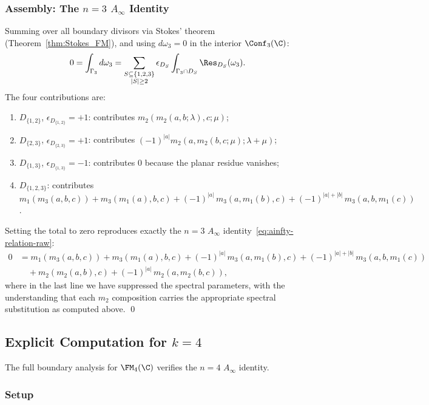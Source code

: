 \subsubsection{Assembly: The $n=3$ $A_\infty$ Identity}

\begin{proposition}[$k=3$ Stasheff identity]
\label{prop:k3_identity}
Summing over all boundary divisors via Stokes' theorem (Theorem~\ref{thm:Stokes_FM}), and using $d\omega_3 = 0$ in the interior $\Conf_3(\C)$:
\[
0 = \int_{\Gamma_3} d\omega_3 =
\sum_{\substack{S \subseteq \{1,2,3\} \\ |S| \geq 2}}
\epsilon_{D_S}\int_{\Gamma_3 \cap D_S}\Res_{D_S}(\omega_3).
\]
The four contributions are:
\begin{enumerate}[label=(\roman*)]
\item \(D_{\{1,2\}}\), \(\epsilon_{D_{\{1,2\}}}=+1\):
contributes \(m_2(m_2(a,b;\lambda),c;\mu)\);
\item \(D_{\{2,3\}}\), \(\epsilon_{D_{\{2,3\}}}=+1\):
contributes \((-1)^{|a|}m_2(a,m_2(b,c;\mu);\lambda+\mu)\);
\item \(D_{\{1,3\}}\), \(\epsilon_{D_{\{1,3\}}}=-1\):
contributes \(0\) because the planar residue vanishes;
\item $D_{\{1,2,3\}}$: contributes $m_1(m_3(a,b,c)) + m_3(m_1(a),b,c) + (-1)^{|a|}\, m_3(a,m_1(b),c) + (-1)^{|a|+|b|}\, m_3(a,b,m_1(c))$.
\end{enumerate}
Setting the total to zero reproduces exactly the $n=3$ $A_\infty$ identity~\eqref{eq:ainfty-relation-raw}:
\begin{align*}
0 &= m_1(m_3(a,b,c)) + m_3(m_1(a),b,c) + (-1)^{|a|}\, m_3(a,m_1(b),c) + (-1)^{|a|+|b|}\, m_3(a,b,m_1(c)) \\
&\quad + m_2(m_2(a,b),c) + (-1)^{|a|}\, m_2(a,m_2(b,c)),
\end{align*}
where in the last line we have suppressed the spectral parameters, with the understanding that each $m_2$ composition carries the appropriate spectral substitution as computed above. \qed
\end{proposition}

\subsection{Explicit Computation for $k=4$}
\label{subsec:k4_computation}

The full boundary analysis for $\FM_4(\C)$ verifies the $n=4$ $A_\infty$ identity.

\subsubsection{Setup}

